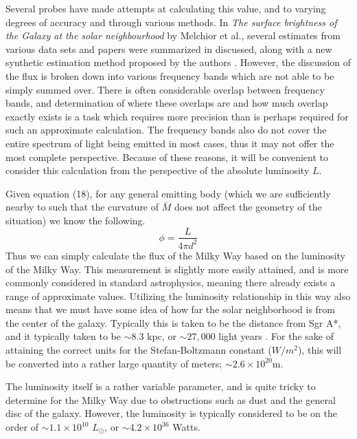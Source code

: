 \documentclass[a4paper]{article}
\begin{document}
    Several probes have made attempts at calculating this value, and to varying
    degrees of accuracy and through various methods. In \textit{The surface
    brightness of the Galaxy at the solar neighbourhood} by Melchior et al.,
    several estimates from various data sets and papers were summarized in
    discussed, along with a new synthetic estimation method proposed by the
    authors \cite{melchior}. However, the discussion of the flux is broken down
    into various frequency bands which are not able to be simply summed over.
    There is often considerable overlap between frequency bands, and
    determination of where these overlaps are and how much overlap exactly
    exists is a task which requires more precision than is perhaps required for
    such an approximate calculation. The frequency bands also do not cover the
    entire spectrum of light being emitted in most cases, thus it may not offer
    the most complete perspective. Because of these reasons, it will be
    convenient to consider this calculation from the perspective of the
    absolute luminosity $L$.

    Given equation (18), for any general emitting body (which we are
    sufficiently nearby to such that the curvature of $\bar{M}$ does not affect
    the geometry of the situation) we know the following.
    \begin{equation*}
        \phi = \frac{L}{4 \pi d^2} 
    \end{equation*}
    Thus we can simply calculate the flux of the Milky Way based on the
    luminosity of the Milky Way. This measurement is slightly more easily
    attained, and is more commonly considered in standard astrophysics, meaning
    there already exists a range of approximate values. Utilizing the
    luminosity relationship in this way also means that we must have some idea
    of how far the solar neighborhood is from the center of the galaxy.
    Typically this is taken to be the distance from Sgr A*, and it typically
    taken to be $\sim 8.3$ kpc, or $\sim 27,000$ light years
    \cite{stellar_orbits}\cite{nasa}. For the sake of attaining the correct
    units for the Stefan-Boltzmann constant ($W/m^2$), this will be converted
    into a rather large quantity of meters; $\sim 2.6 \times 10^{20}$m. 

    The luminosity itself is a rather variable parameter, and is quite tricky
    to determine for the Milky Way due to obstructions such as dust and the
    general disc of the galaxy. However, the luminosity is typically considered
    to be on the order of $\sim 1.1 \times 10^{10}$ $L_{\odot}$, or $\sim 4.2 
    \times 10^{36}$ Watts\cite{local_group}.
\end{document}
